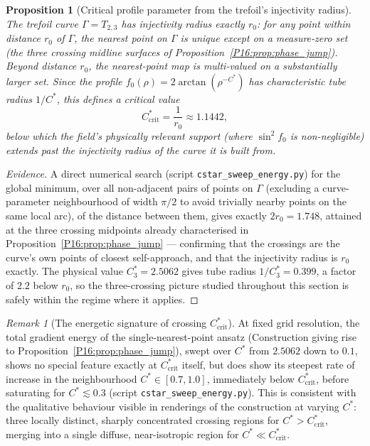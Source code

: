 \documentclass[11pt,a4paper]{article}
\newtheorem{proposition}[theorem]{Proposition}
\theoremstyle{definition}\newtheorem{definition}[theorem]{Definition}
\theoremstyle{remark}
\newtheorem{remark}[theorem]{Remark}
\theoremstyle{definition}\newtheorem{construction}[theorem]{Construction}
\begin{document}
\begin{proposition}[Critical profile parameter from the trefoil's
  injectivity radius]
\label{P16:prop:cstar_crit}
The trefoil curve $\Gamma=T_{2,3}$ has injectivity radius exactly
$r_0$: for any point within distance $r_0$ of $\Gamma$, the nearest
point on $\Gamma$ is unique except on a measure-zero set (the three
crossing midline surfaces of Proposition~\ref{P16:prop:phase_jump}).
Beyond distance $r_0$, the nearest-point map is multi-valued on a
substantially larger set. Since the profile $f_0(\rho)=2\arctan(\rho^{-C^*}\!)$
has characteristic tube radius $1/C^*$, this defines a critical
value
\begin{equation}
  C^*_{\mathrm{crit}} = \frac{1}{r_0} \approx 1.1442,
  \label{P16:eq:cstar_crit}
\end{equation}
below which the field's physically relevant support (where
$\sin^2\!f_0$ is non-negligible) extends past the injectivity radius
of the curve it is built from.
\end{proposition}

\begin{proof}[Evidence]
A direct numerical search (script \texttt{cstar\_sweep\_energy.py})
for the global minimum, over all non-adjacent pairs of points on
$\Gamma$ (excluding a curve-parameter neighbourhood of width $\pi/2$
to avoid trivially nearby points on the same local arc), of the
distance between them, gives exactly $2r_0=1.748$, attained at the
three crossing midpoints already characterised in
Proposition~\ref{P16:prop:phase_jump} --- confirming that the crossings
are the curve's own points of closest self-approach, and that the
injectivity radius is $r_0$ exactly. The physical value
$C_3^*=2.5062$ gives tube radius $1/C_3^*=0.399$, a factor of $2.2$
below $r_0$, so the three-crossing picture studied throughout this
section is safely within the regime where it applies.
\end{proof}

\begin{remark}[The energetic signature of crossing $C^*_{\mathrm{crit}}$]
\label{P16:rem:cstar_energy_signature}
At fixed grid resolution, the total gradient energy of the
single-nearest-point ansatz (Construction giving rise to
Proposition~\ref{P16:prop:phase_jump}), swept over $C^*$ from $2.5062$
down to $0.1$, shows no special feature exactly at
$C^*_{\mathrm{crit}}$ itself, but does show its steepest rate of
increase in the neighbourhood $C^*\in[0.7,1.0]$, immediately below
$C^*_{\mathrm{crit}}$, before saturating for $C^*\lesssim0.3$
(script \texttt{cstar\_sweep\_energy.py}). This is consistent with
the qualitative behaviour visible in renderings of the construction
at varying $C^*$: three locally distinct, sharply concentrated
crossing regions for $C^*>C^*_{\mathrm{crit}}$, merging into a single
diffuse, near-isotropic region for $C^*\ll C^*_{\mathrm{crit}}$.
\end{remark}
\end{document}
